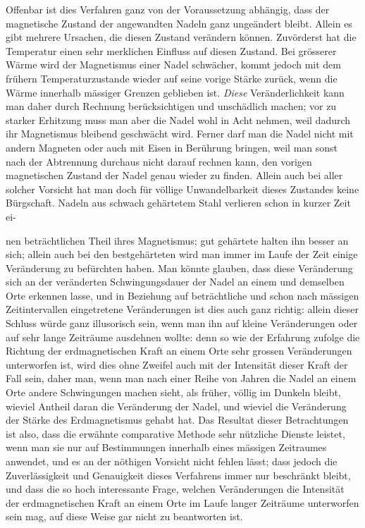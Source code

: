 Offenbar ist dies Verfahren ganz von der Voraussetzung abhängig, dass der magnetische Zustand der angewandten Nadeln ganz ungeändert bleibt. Allein es gibt mehrere Ursachen, die diesen Zustand verändern können. Zuvörderst hat die Temperatur einen sehr merklichen Einfluss auf diesen Zustand. Bei grösserer Wärme wird der Magnetismus einer Nadel schwächer, kommt jedoch mit dem frühern Temperaturzustande wieder auf seine vorige Stärke zurück, wenn die Wärme innerhalb mässiger Grenzen geblieben ist. \textit{Diese} Veränderlichkeit kann man daher durch Rechnung berücksichtigen und unschädlich machen; vor zu starker Erhitzung muss man aber die Nadel wohl in Acht nehmen, weil dadurch ihr Magnetismus bleibend geschwächt wird. Ferner darf man die Nadel nicht mit andern Magneten oder auch mit Eisen in Berührung bringen, weil man sonst nach der Abtrennung durchaus nicht darauf rechnen kann, den vorigen magnetischen Zustand der Nadel genau wieder zu finden. Allein auch bei aller solcher Vorsicht hat man doch für völlige Unwandelbarkeit dieses Zustandes keine Bürgschaft. Nadeln aus schwach gehärtetem Stahl verlieren schon in kurzer Zeit ei-
\par\clearpage
{}
\noindent nen beträchtlichen Theil ihres Magnetismus; gut gehärtete halten ihn besser an sich; allein auch bei den bestgehärteten wird man immer im Laufe der Zeit einige Veränderung zu befürchten haben. Man könnte glauben, dass diese Veränderung sich an der veränderten Schwingungsdauer der Nadel an einem und demselben Orte erkennen lasse, und in Beziehung auf beträchtliche und schon nach mässigen Zeitintervallen eingetretene Veränderungen ist dies auch ganz richtig: allein dieser Schluss würde ganz illusorisch sein, wenn man ihn auf kleine Veränderungen oder auf sehr lange Zeiträume ausdehnen wollte: denn so wie der Erfahrung zufolge die Richtung der erdmagnetischen Kraft an einem Orte sehr grossen Veränderungen unterworfen ist, wird dies ohne Zweifel auch mit der Intensität dieser Kraft der Fall sein, daher man, wenn man nach einer Reihe von Jahren die Nadel an einem Orte andere Schwingungen machen sieht, als früher, völlig im Dunkeln bleibt, wieviel Antheil daran die Veränderung der Nadel, und wieviel die Veränderung der Stärke des Erdmagnetismus gehabt hat. Das Resultat dieser Betrachtungen ist also, dass die erwähnte comparative Methode sehr nützliche Dienste leistet, wenn man sie nur auf Bestimmungen innerhalb eines mässigen Zeitraumes anwendet, und es an der nöthigen Vorsicht nicht fehlen lässt; dass jedoch die Zuverlässigkeit und Genauigkeit dieses Verfahrens immer nur beschränkt bleibt, und dass die so hoch interessante Frage, welchen Veränderungen die Intensität der erdmagnetischen Kraft an einem Orte im Laufe langer Zeiträume unterworfen sein mag, auf diese Weise gar nicht zu beantworten ist.

